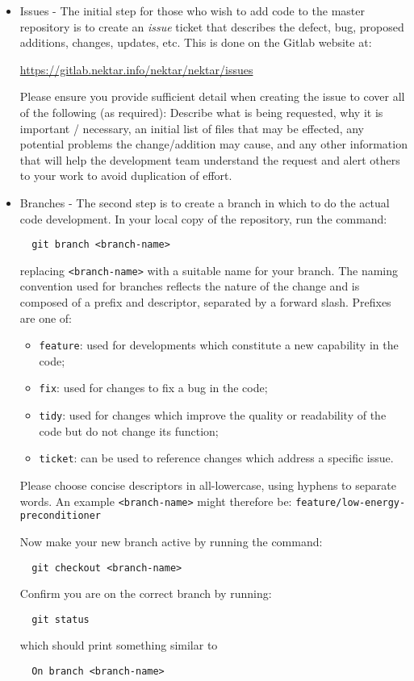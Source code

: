 \begin{itemize}
  \item Issues - The initial step for those who wish to add code to the
  master repository is to create an \emph{issue} ticket that describes the
  defect, bug, proposed additions, changes, updates, etc.  This is done on the Gitlab website at:
  
  \url{https://gitlab.nektar.info/nektar/nektar/issues}

  Please ensure you provide sufficient detail when creating the issue to cover
  all of the following (as required): Describe what is being
  requested, why it is important / necessary, an initial list of files
  that may be effected, any potential problems the change/addition may
  cause, and any other information that will help the development team
  understand the request and alert others to your work to avoid duplication of effort.
  
  \item Branches - The second step is to create a {\GIT} branch in which to do
  the actual code development. In your local copy of the {\nek} repository, run the command:
  \begin{lstlisting}  
  git branch <branch-name>
  \end{lstlisting}
  replacing \lstinline{<branch-name>} with a suitable name for your branch. The naming convention used for branches reflects the nature of the change and is composed of a prefix and descriptor, separated by a forward slash. Prefixes are one of:
  \begin{itemize}
      \item \texttt{feature}: used for developments which constitute a new capability in the code;
      \item \texttt{fix}: used for changes to fix a bug in the code;
      \item \texttt{tidy}: used for changes which improve the quality or readability of the code but do not change its function;
      \item \texttt{ticket}: can be used to reference changes which address a specific issue.
  \end{itemize}
  Please choose concise descriptors in all-lowercase, using hyphens to separate words. An example \lstinline{<branch-name>} might therefore be: \lstinline{feature/low-energy-preconditioner}
  
  Now make your new branch active by running the command:
  \begin{lstlisting}
  git checkout <branch-name>
  \end{lstlisting}
  Confirm you are on the correct branch by running:
  \begin{lstlisting}
  git status
  \end{lstlisting}
  which should print something similar to
  \begin{lstlisting}
  On branch <branch-name>
  \end{lstlisting}


\end{itemize}
